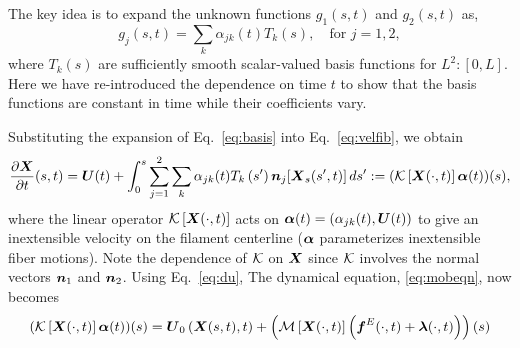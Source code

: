 The key idea is to expand the unknown functions $g_1(s,t)$ and $g_2(s,t)$ as, 
\begin{equation}
\label{eq:basis}
g_j(s,t) = \sum_k \alpha_{jk}(t) T_k(s), \quad \text{for $j=1, 2$}, 
\end{equation}
where $T_k(s)$ are sufficiently smooth scalar-valued basis functions for $L^2:[0,L]$. Here we have re-introduced the dependence on time $t$ to show that the basis functions are constant in time while their coefficients vary. 

Substituting the expansion of Eq.\ \eqref{eq:basis} into Eq.\ \eqref{eq:velfib}, we obtain
\begin{equation}
\label{eq:du}
\frac{\partial \boldsymbol{X}}{\partial t}(s,t) =\boldsymbol{U}(t) + \int_0^s \sum_{j=1}^2\sum_k \alpha_{jk}(t) T_k\left(s'\right) \boldsymbol{n}_j[\boldsymbol{X}_s(s',t)] \, ds' := (\mathcal{K}\left[\boldsymbol{X}(\cdot,t)\right]\boldsymbol{\alpha}(t))(s),
\end{equation}
where the linear operator $\mathcal{K}\left[\boldsymbol{X}(\cdot,t)\right]$ acts on $\boldsymbol{\alpha}(t)=(\alpha_{jk}(t),\boldsymbol{U}(t))$ to give an inextensible velocity on the filament centerline ($\boldsymbol{\alpha}$ parameterizes inextensible fiber motions). Note the dependence of $\mathcal{K}$ on $\boldsymbol{X}$ since $\mathcal{K}$ involves the normal vectors $\boldsymbol{n}_1$ and $\boldsymbol{n}_2$. Using Eq.\ \eqref{eq:du}, The dynamical equation, \eqref{eq:mobeqn}, now becomes
\begin{equation}
\label{eq:veleqn}
(\mathcal{K}\left[\boldsymbol{X}(\cdot,t)\right]\boldsymbol{\alpha}(t))(s) = \boldsymbol{U}_0\left(\boldsymbol{X}(s,t),t\right) + \left(\mathcal{M}\left[\boldsymbol{X}(\cdot,t)\right]\left(\boldsymbol{f}^E(\cdot,t) +\boldsymbol{\lambda}(\cdot,t)\right)\right)(s)
\end{equation}

